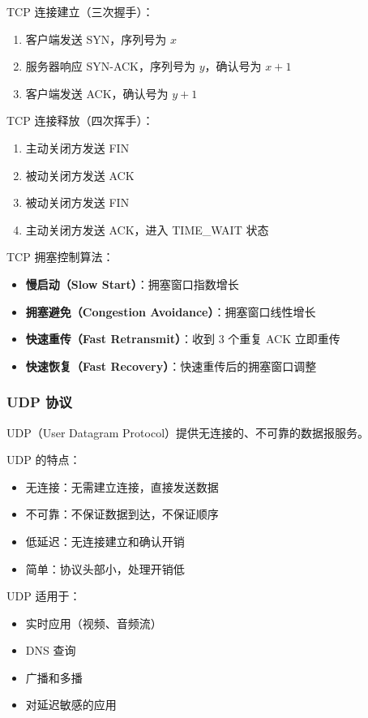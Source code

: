 TCP 连接建立（三次握手）：
\begin{enumerate}
  \item 客户端发送 SYN，序列号为 $x$
  \item 服务器响应 SYN-ACK，序列号为 $y$，确认号为 $x+1$
  \item 客户端发送 ACK，确认号为 $y+1$
\end{enumerate}

TCP 连接释放（四次挥手）：
\begin{enumerate}
  \item 主动关闭方发送 FIN
  \item 被动关闭方发送 ACK
  \item 被动关闭方发送 FIN
  \item 主动关闭方发送 ACK，进入 TIME\_WAIT 状态
\end{enumerate}

TCP 拥塞控制算法：
\begin{itemize}
  \item \textbf{慢启动（Slow Start）}：拥塞窗口指数增长
  \item \textbf{拥塞避免（Congestion Avoidance）}：拥塞窗口线性增长
  \item \textbf{快速重传（Fast Retransmit）}：收到 3 个重复 ACK 立即重传
  \item \textbf{快速恢复（Fast Recovery）}：快速重传后的拥塞窗口调整
\end{itemize}

\subsubsection{UDP 协议}

UDP（User Datagram Protocol）提供无连接的、不可靠的数据报服务。

UDP 的特点：
\begin{itemize}
  \item 无连接：无需建立连接，直接发送数据
  \item 不可靠：不保证数据到达，不保证顺序
  \item 低延迟：无连接建立和确认开销
  \item 简单：协议头部小，处理开销低
\end{itemize}

UDP 适用于：
\begin{itemize}
  \item 实时应用（视频、音频流）
  \item DNS 查询
  \item 广播和多播
  \item 对延迟敏感的应用
\end{itemize}

